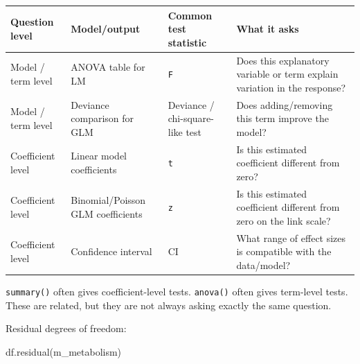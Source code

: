 \documentclass[
  letterpaper,
  8pt,
  a4paper]{book}
\newenvironment{Shaded}{\begin{snugshade}}{\end{snugshade}}
\newcommand{\FunctionTok}[1]{\textcolor[rgb]{0.28,0.35,0.67}{#1}}
\newcommand{\NormalTok}[1]{\textcolor[rgb]{0.00,0.23,0.31}{#1}}
\newcounter{none} %
\begin{document}
{\def\LTcaptype{none} %
\begin{longtable}[]{@{}
  >{\raggedright\arraybackslash}p{}
  >{\raggedright\arraybackslash}p{}
  >{\raggedright\arraybackslash}p{}
  >{\raggedright\arraybackslash}p{}@{}}
\toprule\noalign{}
\begin{minipage}[b]{\linewidth}\raggedright
Question level
\end{minipage} & \begin{minipage}[b]{\linewidth}\raggedright
Model/output
\end{minipage} & \begin{minipage}[b]{\linewidth}\raggedright
Common test statistic
\end{minipage} & \begin{minipage}[b]{\linewidth}\raggedright
What it asks
\end{minipage} \\
\midrule\noalign{}
\endhead
\bottomrule\noalign{}
\endlastfoot
Model / term level & ANOVA table for LM & \texttt{F} & Does this
explanatory variable or term explain variation in the response? \\
Model / term level & Deviance comparison for GLM & Deviance /
chi-square-like test & Does adding/removing this term improve the
model? \\
Coefficient level & Linear model coefficients & \texttt{t} & Is this
estimated coefficient different from zero? \\
Coefficient level & Binomial/Poisson GLM coefficients & \texttt{z} & Is
this estimated coefficient different from zero on the link scale? \\
Coefficient level & Confidence interval & CI & What range of effect
sizes is compatible with the data/model? \\
\end{longtable}
}

\texttt{summary()} often gives coefficient-level tests. \texttt{anova()}
often gives term-level tests. These are related, but they are not always
asking exactly the same question.

Residual degrees of freedom:

\begin{Shaded}
\begin{Highlighting}[]
\FunctionTok{df.residual}\NormalTok{(m\_metabolism)}
\end{Highlighting}
\end{Shaded}
\end{document}
